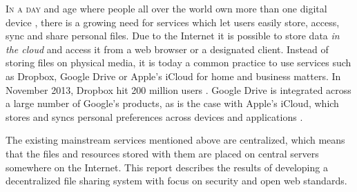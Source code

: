 \lettrine[lines=3]{I}{n a day} and age where people all over the world own more than one digital device \cite{OFCOMa:Online} \cite{OFCOMb:Online}, there is a growing need for services which let users easily store, access, sync and share personal files. Due to the Internet it is possible to store data \emph{in the cloud} and access it from a web browser or a designated client. Instead of storing files on physical media, it is today a common practice to use services such as Dropbox, Google Drive or Apple's iCloud for home and business matters. In November 2013, Dropbox hit 200 million users \cite{Constine:2013:Online}. Google Drive is integrated across a large number of Google's products, as is the case with Apple's iCloud, which stores and syncs personal preferences across devices and applications \cite{CloudTrend:Online}.

The existing mainstream services mentioned above are centralized, which means that the files and resources stored with them are placed on central servers somewhere on the Internet. This report describes the results of developing a decentralized file sharing system with focus on security and open web standards.






